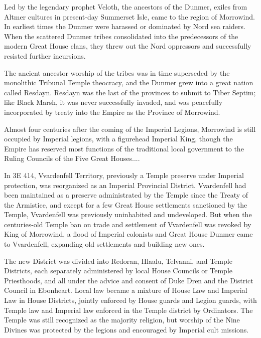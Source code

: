 
\dropcap Led by the legendary prophet Veloth, the ancestors of the Dunmer, exiles from Altmer cultures in present-day Summerset Isle, came to the region of Morrowind. In earliest times the Dunmer were harassed or dominated by Nord sea raiders. When the scattered Dunmer tribes consolidated into the predecessors of the modern Great House clans, they threw out the Nord oppressors and successfully resisted further incursions.

The ancient ancestor worship of the tribes was in time superseded by the monolithic Tribunal Temple theocracy, and the Dunmer grew into a great nation called Resdayn. Resdayn was the last of the provinces to submit to Tiber Septim; like Black Marsh, it was never successfully invaded, and was peacefully incorporated by treaty into the Empire as the Province of Morrowind.

Almost four centuries after the coming of the Imperial Legions, Morrowind is still occupied by Imperial legions, with a figurehead Imperial King, though the Empire has reserved most functions of the traditional local government to the Ruling Councils of the Five Great Houses....

In 3E 414, Vvardenfell Territory, previously a Temple preserve under Imperial protection, was reorganized as an Imperial Provincial District. Vvardenfell had been maintained as a preserve administrated by the Temple since the Treaty of the Armistice, and except for a few Great House settlements sanctioned by the Temple, Vvardenfell was previously uninhabited and undeveloped. But when the centuries-old Temple ban on trade and settlement of Vvardenfell was revoked by King of Morrowind, a flood of Imperial colonists and Great House Dunmer came to Vvardenfell, expanding old settlements and building new ones.

The new District was divided into Redoran, Hlaalu, Telvanni, and Temple Districts, each separately administered by local House Councils or Temple Priesthoods, and all under the advice and consent of Duke Dren and the District Council in Ebonheart. Local law became a mixture of House Law and Imperial Law in House Districts, jointly enforced by House guards and Legion guards, with Temple law and Imperial law enforced in the Temple district by Ordinators. The Temple was still recognized as the majority religion, but worship of the Nine Divines was protected by the legions and encouraged by Imperial cult missions.

